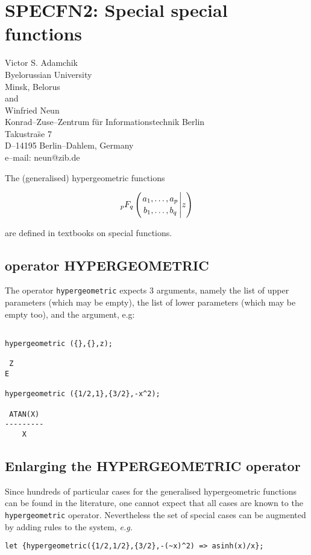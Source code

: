 \chapter{SPECFN2: Special special functions}
\label{SPECFN2}

{\footnotesize
\begin{center}
Victor S. Adamchik \\
Byelorussian University \\
Minsk, Belorus \\[0.1in]
and\\[0.05in]
Winfried Neun \\
Konrad--Zuse--Zentrum f\"ur Informationstechnik Berlin \\
Takustra\"se 7 \\
D--14195 Berlin--Dahlem, Germany \\[0.05in]
e--mail: neun@zib.de

\end{center}
}

The (generalised) hypergeometric functions  

\begin{displaymath}
_pF_q \left( {{a_1, \ldots , a_p} \atop {b_1, \ldots ,b_q}} \Bigg\vert z \right)
\end{displaymath}

are defined in textbooks on special functions.
\section{\REDUCE{} operator HYPERGEOMETRIC}

The operator {\tt hypergeometric} expects 3 arguments, namely the 
list of upper parameters (which may be empty), the list of lower
parameters (which may be empty too), and the argument, e.g:

\begin{verbatim}

hypergeometric ({},{},z);

 Z
E

hypergeometric ({1/2,1},{3/2},-x^2);

 ATAN(X)
---------
    X
\end{verbatim}


\section{Enlarging the HYPERGEOMETRIC operator}

Since hundreds of particular cases for the generalised hypergeometric
functions can be found in the literature, one cannot expect that all
cases are known to the {\tt hypergeometric} operator.
Nevertheless the set of special cases can be augmented by adding
rules to the \REDUCE{} system, {\em e.g.}
\begin{verbatim}
let {hypergeometric({1/2,1/2},{3/2},-(~x)^2) => asinh(x)/x};
\end{verbatim}

